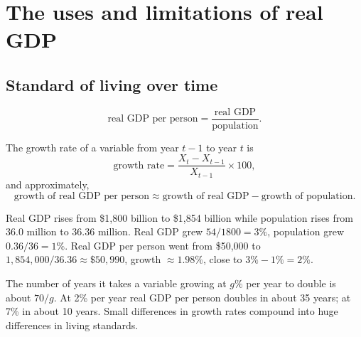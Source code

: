 \section{The uses and limitations of real GDP}

\subsection{Standard of living over time}

\begin{definition}
\[
  \text{real GDP per person} = \frac{\text{real GDP}}{\text{population}}.
\]
\end{definition}

The growth rate of a variable from year $t-1$ to year $t$ is
\[
  \text{growth rate} = \frac{X_t - X_{t-1}}{X_{t-1}} \times 100,
\]
and approximately,
\[
  \text{growth of real GDP per person} \approx \text{growth of real GDP} -
  \text{growth of population}.
\]

\begin{example}
Real GDP rises from \$1{,}800 billion to \$1{,}854 billion while population rises from
36.0 million to 36.36 million. Real GDP grew $54/1800 = 3\%$, population grew
$0.36/36 = 1\%$. Real GDP per person went from \$50{,}000 to
$1{,}854{,}000/36.36 \approx \$50{,}990$, growth $\approx 1.98\%$, close to $3\% - 1\% = 2\%$.
\end{example}

\begin{important}[Rule of 70]
The number of years it takes a variable growing at $g\%$ per year to double is about
$70/g$. At 2\% per year real GDP per person doubles in about 35 years; at 7\% in about
10 years. Small differences in growth rates compound into huge differences in living
standards.
\end{important}

\begin{center}
\end{center}

